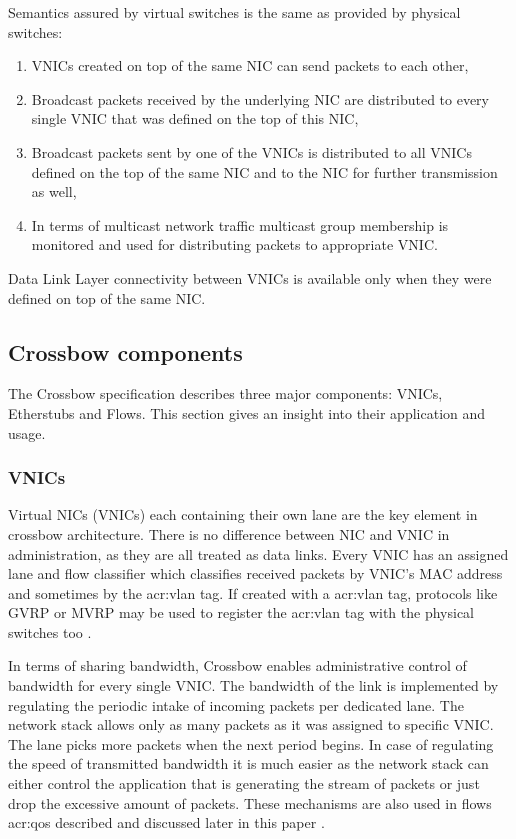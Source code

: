 \documentclass[11pt]{book}
\begin{document}
        Semantics assured by virtual switches is the same as provided by physical switches: 

        \begin{enumerate}
          \item VNICs created on top of the same NIC can send packets to each other,
          \item Broadcast packets received by the underlying NIC are distributed to every single VNIC that was defined
                on the top of this NIC,
          \item Broadcast packets sent by one of the VNICs is distributed to all VNICs defined on the top of the same
                NIC and to the NIC for further transmission as well,
          \item In terms of multicast network traffic multicast group membership is monitored and used for distributing
                packets to appropriate VNIC.
        \end{enumerate}

        Data Link Layer connectivity between VNICs is available only when they were defined on top of the same NIC. 

	
      \subsection{Crossbow components}

        The Crossbow specification describes three major components: VNICs, Etherstubs and Flows. This section gives an
        insight into their application and usage.

                
        \subsubsection{VNICs}
        
          Virtual NICs (VNICs) each containing their own lane are the key element in crossbow architecture. There is no
          difference between NIC and VNIC in administration, as they are all treated as data links. Every VNIC has an
          assigned lane and flow classifier which classifies received packets by VNIC's MAC address and sometimes by the
          \gls{acr:vlan} tag.  If created with a \gls{acr:vlan} tag, protocols like GVRP or MVRP may be used to register the
          \gls{acr:vlan} tag with the physical switches too \cite{crossbow}.	

          In terms of sharing bandwidth, Crossbow enables administrative control of bandwidth for every single VNIC. The
          bandwidth of the link is implemented by regulating the periodic intake of incoming packets per dedicated lane.
          The network stack allows only as many packets as it was assigned to specific VNIC. The lane picks more packets
          when the next period begins. In case of regulating the speed of transmitted bandwidth it is much easier as the
          network stack can either control the application that is generating the stream of packets or just drop the
          excessive amount of packets.  These mechanisms are also used in flows \gls{acr:qos} described and discussed later in
          this paper \cite{crossbow}.
\end{document}
